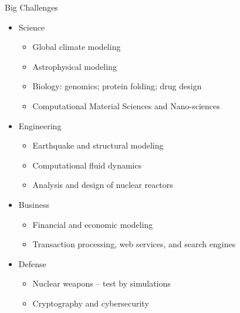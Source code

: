 \documentclass[xcolor=x11names,compress, handout]{beamer}
\renewcommand{\(}{\begin{columns}}
\renewcommand{\)}{\end{columns}}
\newcommand{\<}[1]{\begin{column}{#1}}
\renewcommand{\>}{\end{column}}
\begin{document}
\begin{frame}{Big Challenges}
\begin{itemize}
\item Science
\begin{itemize}
\item Global climate modeling
\item Astrophysical modeling
\item Biology: genomics; protein folding; drug design
\item \alert{Computational Material Sciences} and Nano-sciences
\end{itemize}
\item Engineering
\begin{itemize}
\item Earthquake and structural modeling
\item \alert{Computational fluid dynamics} 
\item Analysis and design of \alert{nuclear reactors}
\end{itemize}
\item Business
\begin{itemize}
\item Financial and economic modeling
\item Transaction processing, web services, and search engines
\end{itemize}
\item Defense
\begin{itemize}
\item Nuclear weapons -- test by simulations
\item Cryptography and cybersecurity
\end{itemize}
\end{itemize}
\end{frame}

\end{document}
